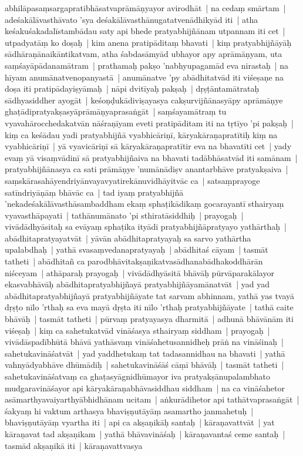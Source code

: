 \documentclass[article,12pt,a4paper]{memoir}%
\begin{document}
abhilāpasaṃsargapratibhāsatvaprāmāṇyayor avirodhāt | \label{thakur75-114.13} na cedaṃ smārtam | adeśakālāvasthāvato 'sya deśakālāvasthānugatatvenādhikyād iti | \label{thakur75-114.15} atha keśakuśakadalīstambādau saty api bhede pratyabhijñānam utpannam iti cet | utpadyatāṃ ko doṣaḥ | kim anena pratipāditaṃ bhavati | kiṃ pratyabhijñāyāḥ sādhāraṇānaikāntikatvam, atha śabdasāmyād ubhayor apy aprāmāṇyam, uta saṃśayāpādanamātram | \label{thakur75-114.18} prathamaḥ pakṣo 'nabhyupagamād eva nirastaḥ | na hīyam anumānatvenopanyastā | anumānatve 'py abādhitatvād iti viśeṣaṇe na doṣa iti pratipādayiṣyāmaḥ | \label{thakur75-114.19} nāpi dvitīyaḥ pakṣaḥ | dṛṣṭāntamātrataḥ sādhyasiddher ayogāt | keśoṇḍukādiviṣayasya cakṣurvijñānasyāpy aprāmāṇye ghaṭādipratyakṣasyāprāmāṇyaprasaṅgāt | \label{thakur75-114.21} saṃśayamātraṃ tu vyavahārocchedakatvān nāśraṇīyam eveti pratipāditam iti na tṛtīyo 'pi pakṣaḥ | \label{thakur75-114.23} kiṃ ca keśādau yadi pratyabhijñā vyabhicāriṇī, kāryakāraṇapratītiḥ kiṃ na vyabhicāriṇī | yā vyavicāriṇī sā kāryakāraṇapratītir eva na bhavatīti cet | yady evaṃ yā visaṃvādinī sā pratyabhijñaiva na bhavati tadābhāsatvād iti samānam | pratyabhijñānasya ca sati prāmāṇye 'numānādiṣv anantarbhāve pratyakṣaiva | saṃskārasahāyendriyānvayavyatirekānuvidhāyitvāc ca | satsaṃprayoge satīndriyāṇāṃ bhāvāc ca | tad iyaṃ pratyabhijñā 'nekadeśakālāvasthāsambaddham ekaṃ sphaṭikādikaṃ gocarayantī sthairyaṃ vyavasthāpayati | \label{thakur75-114.30} tathānumānato 'pi sthiratāsiddhiḥ | prayogaḥ | vivādādhyāsitaḥ sa evāyaṃ sphaṭika ityādi pratyabhijñāpratyayo yathārthaḥ | abādhitapratyayatvāt | yāvān abādhitapratyayaḥ sa sarvo yathārtha upalabdhaḥ | yathā svasaṃvedanapratyayaḥ | abādhitaś cāyam | tasmāt tatheti | abādhitañ ca parodbhāvitakṣaṇikatvasādhanabādhakoddhārān niśceyam | \label{thakur75-115.1} athāparaḥ prayogaḥ | vivādādhyāsitā bhāvāḥ pūrvāparakālayor ekasvabhāvāḥ abādhitapratyabhijñayā pratyabhijñāyamānatvāt | yad yad abādhitapratyabhijñayā pratyabhijñāyate tat sarvam abhinnam, yathā yas tvayā dṛṣṭo nīlo 'rthaḥ sa eva mayā dṛṣta iti nīlo 'rthaḥ pratyabhijñāyate | tathā caite bhāvāḥ | tasmāt tatheti | pūrvaṃ pratyayasya dharmitā | adhunā bhāvānām iti viśeṣaḥ | \label{thakur75-115.6} kiṃ ca sahetukatvād vināśasya sthairyaṃ siddham | prayogaḥ | vivādāspadībhūtā bhāvā yathāsvaṃ vināśahetusannidheḥ prāṅ na vināśinaḥ | sahetukavināśatvāt | yad yaddhetukaṃ tat tadasannidhau na bhavati | yathā vahnyādyabhāve dhūmādiḥ | sahetukavināśāś cāṃī bhāvāḥ | tasmāt tatheti | \label{thakur75-115.9}sahetukavināśatvaṃ ca ghaṭasyāgnidhūmayor iva pratyakṣānupalambhato mudgaravināśayor api kāryakāraṇabhāvasiddhau siddham | na ca vināśahetor asāmarthyavaiyarthyābhidhānam ucitam | aṅkurādihetor api tathātvaprasaṅgāt | śakyaṃ hi vaktum arthasya bhaviṣṇutāyāṃ asamartho janmahetuḥ | bhaviṣṇutāyāṃ vyartha iti | \label{thakur75-115.13} api ca akṣaṇikāḥ santaḥ | kāraṇavattvāt | yat kāraṇavat tad akṣaṇikam | yathā bhāvavināśaḥ | kāraṇavantaś ceme santaḥ | tasmād akṣaṇikā iti | \label{thakur75-115.15} kāraṇavattvasya 
\end{document}
